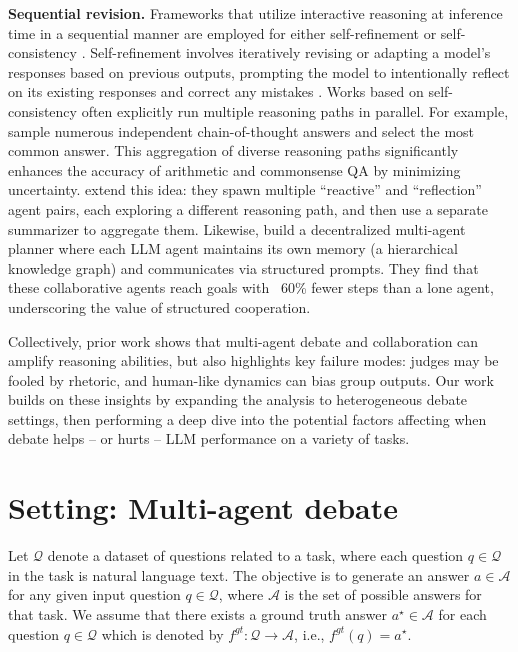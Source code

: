 \documentclass{article}
\begin{document}
\textbf{Sequential revision.}
Frameworks that utilize interactive reasoning at inference time in a sequential manner are employed for either self-refinement \citep{madaan2023self} or self-consistency \citep{wang2022self}. Self-refinement involves iteratively revising or adapting a model's responses based on previous outputs, prompting the model to intentionally reflect on its existing responses and correct any mistakes \citep{kamoi2024can}.
Works based on self-consistency often explicitly run multiple reasoning paths in parallel. For example, \citet{wang2023selfconsistencyimproveschainthought} sample numerous independent chain-of-thought answers and select the most common answer. This aggregation of diverse reasoning paths significantly enhances the accuracy of arithmetic and commonsense QA by minimizing uncertainty.
\citet{he2025enhancingllmreasoningmultipath} extend this idea: they spawn multiple ``reactive'' and ``reflection'' agent pairs, each exploring a different reasoning path, and then use a separate summarizer to aggregate them. Likewise, \citet{yang2025llmpowereddecentralizedgenerativeagents} build a decentralized multi-agent planner where each LLM agent maintains its own memory (a hierarchical knowledge graph) and communicates via structured prompts. They find that these collaborative agents reach goals with ~60\% fewer steps than a lone agent, underscoring the value of structured cooperation.

Collectively, prior work shows that multi-agent debate and collaboration can amplify reasoning abilities, but also highlights key failure modes: judges may be fooled by rhetoric, and human-like dynamics can bias group outputs. Our work builds on these insights by expanding the analysis to heterogeneous debate settings, then performing a deep dive into the potential factors affecting when debate helps -- or hurts -- LLM performance on a variety of tasks. 


\section{Setting: Multi-agent debate}
\label{sec:setting}

Let $\mathcal{Q}$ denote a dataset of questions related to a task, where each question $q \in \mathcal{Q}$ in the task is natural language text. The objective is to generate an answer $a \in \mathcal{A}$ for any given input question $q \in \mathcal{Q}$, where $\mathcal{A}$ is the set of possible answers for that task.
We assume that there exists a ground truth answer $a^\star \in \mathcal{A}$ for each question $q \in \mathcal{Q}$ which is denoted by $f^{gt}: \mathcal{Q} \rightarrow \mathcal{A}$, i.e., $f^{gt}(q) = a^\star$.
\end{document}

